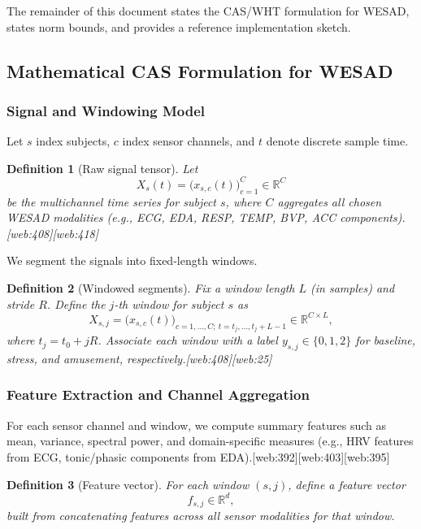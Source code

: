 \documentclass[11pt]{article}
\newtheorem{definition}{Definition}[section]
\newcommand{\R}{\mathbb{R}}
\begin{document}
The remainder of this document states the CAS/WHT formulation for WESAD, states norm bounds, and provides a reference implementation sketch.

\subsection{Mathematical CAS Formulation for WESAD}

\subsubsection{Signal and Windowing Model}

Let \(s\) index subjects, \(c\) index sensor channels, and \(t\) denote discrete sample time.

\begin{definition}[Raw signal tensor]
Let
\[
  X_s(t) = \bigl( x_{s,c}(t) \bigr)_{c=1}^{C} \in \R^{C}
\]
be the multichannel time series for subject \(s\), where \(C\) aggregates all chosen WESAD modalities (e.g., ECG, EDA, RESP, TEMP, BVP, ACC components).\cite{Schmidt2018_WESAD,WESAD_CrossDomain}[web:408][web:418]
\end{definition}

We segment the signals into fixed-length windows.

\begin{definition}[Windowed segments]
Fix a window length \(L\) (in samples) and stride \(R\).
Define the \(j\)-th window for subject \(s\) as
\[
  X_{s,j} = \bigl(x_{s,c}(t)\bigr)_{c=1,\dots,C;\ t = t_j,\dots,t_j+L-1}
  \in \R^{C \times L},
\]
where \(t_j = t_0 + jR\).
Associate each window with a label \(y_{s,j} \in \{0,1,2\}\) for baseline, stress, and amusement, respectively.\cite{Schmidt2018_WESAD}[web:408][web:25]
\end{definition}

\subsubsection{Feature Extraction and Channel Aggregation}

For each sensor channel and window, we compute summary features such as mean, variance, spectral power, and domain-specific measures (e.g., HRV features from ECG, tonic/phasic components from EDA).\cite{WESAD_JohnsonGitHub,WESAD_MMIImplementation,WESAD_Siyixu}[web:392][web:403][web:395]

\begin{definition}[Feature vector]
For each window \((s,j)\), define a feature vector
\[
  f_{s,j} \in \R^d,
\]
built from concatenating features across all sensor modalities for that window.
\end{definition}
\end{document}
